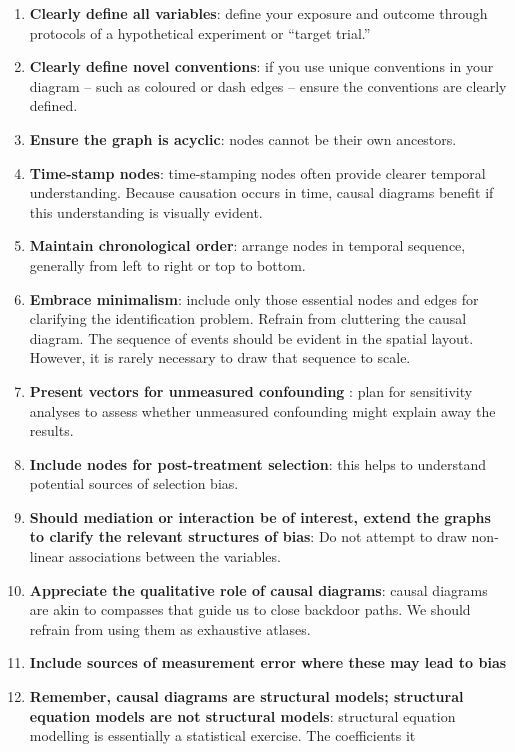 \documentclass[
  singlecolumn]{report}
\begin{document}
\begin{enumerate}
\def\labelenumi{\arabic{enumi}.}
\item
  \textbf{Clearly define all variables}: define your exposure and
  outcome through protocols of a hypothetical experiment or ``target
  trial.''
\item
  \textbf{Clearly define novel conventions}: if you use unique
  conventions in your diagram -- such as coloured or dash edges --
  ensure the conventions are clearly defined.
\item
  \textbf{Ensure the graph is acyclic}: nodes cannot be their own
  ancestors.
\item
  \textbf{Time-stamp nodes}: time-stamping nodes often provide clearer
  temporal understanding. Because causation occurs in time, causal
  diagrams benefit if this understanding is visually evident.
\item
  \textbf{Maintain chronological order}: arrange nodes in temporal
  sequence, generally from left to right or top to bottom.
\item
  \textbf{Embrace minimalism}: include only those essential nodes and
  edges for clarifying the identification problem. Refrain from
  cluttering the causal diagram. The sequence of events should be
  evident in the spatial layout. However, it is rarely necessary to draw
  that sequence to scale.
\item
  \textbf{Present vectors for unmeasured confounding} : plan for
  sensitivity analyses to assess whether unmeasured confounding might
  explain away the results.
\item
  \textbf{Include nodes for post-treatment selection}: this helps to
  understand potential sources of selection bias.
\item
  \textbf{Should mediation or interaction be of interest, extend the
  graphs to clarify the relevant structures of bias}: Do not attempt to
  draw non-linear associations between the variables.
\item
  \textbf{Appreciate the qualitative role of causal diagrams}: causal
  diagrams are akin to compasses that guide us to close backdoor paths.
  We should refrain from using them as exhaustive atlases.
\item
  \textbf{Include sources of measurement error where these may lead to
  bias}
\item
  \textbf{Remember, causal diagrams are structural models; structural
  equation models are not structural models}: structural equation
  modelling is essentially a statistical exercise. The coefficients it

\end{enumerate}
\end{document}
